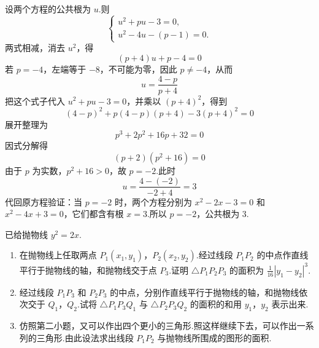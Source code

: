 \documentclass[UTF8,a4paper,oneside,11pt]{ctexbook}
\begin{document}
\begin{solution}
设两个方程的公共根为 \(u\).则
\[
\begin{cases}
u^2+pu-3=0,\\
u^2-4u-(p-1)=0.
\end{cases}
\]
两式相减，消去 \(u^2\)，得
\[
(p+4)u+p-4=0
\]
若 \(p=-4\)，左端等于 \(-8\)，不可能为零，因此 \(p\neq-4\)，从而
\[
u=\frac{4-p}{p+4}
\]
把这个式子代入 \(u^2+pu-3=0\)，并乘以 \((p+4)^2\)，得到
\[
(4-p)^2+p(4-p)(p+4)-3(p+4)^2=0
\]
展开整理为
\[
p^3+2p^2+16p+32=0
\]
因式分解得
\[
(p+2)(p^2+16)=0
\]
由于 \(p\) 为实数，\(p^2+16>0\)，故 \(p=-2\).此时
\[
u=\frac{4-(-2)}{-2+4}=3
\]
代回原方程验证：当 \(p=-2\) 时，两个方程分别为 \(x^2-2x-3=0\) 和 \(x^2-4x+3=0\)，它们都含有根 \(x=3\).所以 \(p=-2\)，公共根为 \(3\).
\end{solution}

\begin{problem}
已给抛物线 \(y^2=2x\).

\begin{enumerate}
\item 在抛物线上任取两点 \(P_1(x_1,y_1)\)，\(P_2(x_2,y_2)\).经过线段 \(P_1P_2\) 的中点作直线平行于抛物线的轴，和抛物线交于点 \(P_3\).证明 \(\triangle P_1P_2P_3\) 的面积为 \(\frac{1}{16}|y_1-y_2|^3\).
\item 经过线段 \(P_1P_3\) 和 \(P_2P_3\) 的中点，分别作直线平行于抛物线的轴，和抛物线依次交于 \(Q_1\)，\(Q_2\).试将 \(\triangle P_1P_3Q_1\) 与 \(\triangle P_2P_3Q_2\) 的面积的和用 \(y_1\)，\(y_2\) 表示出来.
\item 仿照第二小题，又可以作出四个更小的三角形.照这样继续下去，可以作出一系列的三角形.由此设法求出线段 \(P_1P_2\) 与抛物线所围成的图形的面积.
\end{enumerate}

\end{problem}
\end{document}

